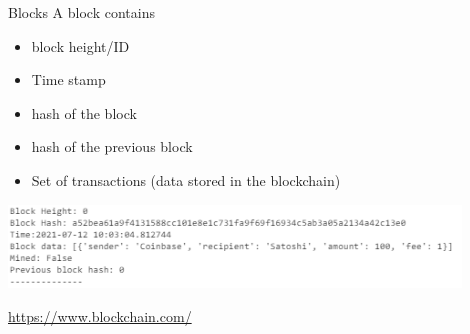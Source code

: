 \documentclass{beamer}
\begin{document}
\begin{frame}{Blocks}
A block contains
\begin{itemize}
  \item block height/ID
  \item Time stamp
  \item hash of the block
  \item hash of the previous block
  \item Set of transactions (data stored in the blockchain)
\end{itemize}
\begin{center}
\includegraphics[width=0.9\textwidth]{../../../Figures/genesis_block.png}
\end{center}
\url{https://www.blockchain.com/}
\end{frame}
\end{document}
